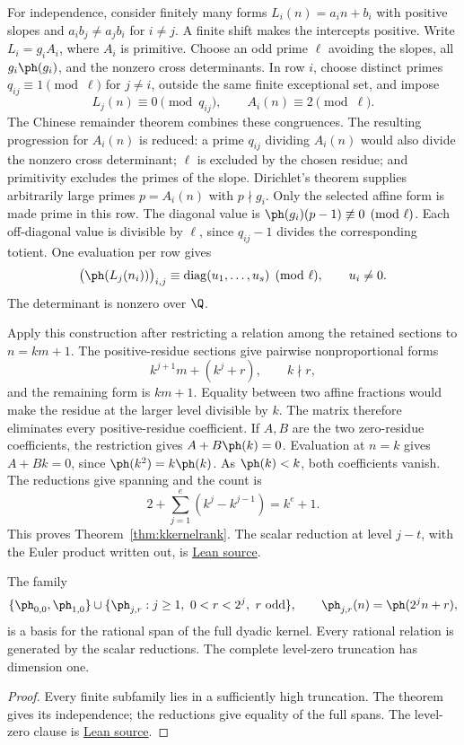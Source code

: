 \documentclass[11pt]{article}
\begin{document}
For independence, consider finitely many forms $L_i(n)=a_in+b_i$ with
positive slopes and $a_ib_j\ne a_jb_i$ for $i\ne j$. A finite shift makes
the intercepts positive. Write $L_i=g_iA_i$, where $A_i$ is primitive.
Choose an odd prime $\ell$ avoiding the slopes, all $g_i\ph(g_i)$, and the
nonzero cross determinants. In row $i$, choose distinct primes
$q_{ij}\equiv1\pmod\ell$ for $j\ne i$, outside the same finite exceptional
set, and impose
\[
 L_j(n)\equiv0\pmod{q_{ij}},\qquad A_i(n)\equiv2\pmod\ell.
\]
The Chinese remainder theorem combines these congruences. The resulting
progression for $A_i(n)$ is reduced: a prime $q_{ij}$ dividing $A_i(n)$
would also divide the nonzero cross determinant; $\ell$ is excluded by the
chosen residue; and primitivity excludes the primes of the slope.
Dirichlet's theorem supplies arbitrarily large primes $p=A_i(n)$ with
$p\nmid g_i$. Only the selected affine form is made prime in this row.
The diagonal value is
$\ph(g_i)(p-1)\not\equiv0\pmod\ell$. Each off-diagonal value is divisible
by $\ell$, since $q_{ij}-1$ divides the corresponding totient.
One evaluation per row gives
\[
 \bigl(\ph(L_j(n_i))\bigr)_{i,j}
 \equiv\operatorname{diag}(u_1,\ldots,u_s)\pmod\ell,
 \qquad u_i\ne0.
\]
The determinant is nonzero over $\Q$.

Apply this construction after restricting a relation among the retained
sections to $n=km+1$. The positive-residue sections give pairwise
nonproportional forms
\[
 k^{j+1}m+(k^j+r),\qquad k\nmid r,
\]
and the remaining form is $km+1$. Equality between two affine fractions
would make the residue at the larger level divisible by $k$. The matrix
therefore eliminates every positive-residue coefficient. If $A,B$ are the
two zero-residue coefficients, the restriction gives
$A+B\ph(k)=0$. Evaluation at $n=k$ gives $A+Bk=0$, since
$\ph(k^2)=k\ph(k)$. As $\ph(k)<k$, both coefficients vanish.
The reductions give spanning and the count is
\[
 2+\sum_{j=1}^e(k^j-k^{j-1})=k^e+1.
\]
This proves Theorem~\ref{thm:kkernelrank}. The scalar reduction at level
$j-t$, with the Euler product written out, is
\href{https://github.com/wcook04/plectis-erdos/blob/f36a98bf3d3e6f65f1074e3b800e3293d5b8a51a/ErdosProblems/Erdos249/PaperCompleteR7/KernelIntegral.lean#L226}{Lean source}.

\begin{corollary}\label{res:basis}
The family
\[
 \{\ph_{0,0},\ph_{1,0}\}
 \cup\{\ph_{j,r}:j\ge1,\ 0<r<2^j,\ r\text{ odd}\},
 \qquad \ph_{j,r}(n)=\ph(2^jn+r),
\]
is a basis for the rational span of the full dyadic kernel. Every rational
relation is generated by the scalar reductions. The complete level-zero
truncation has dimension one.
\end{corollary}
\begin{proof}
Every finite subfamily lies in a sufficiently high truncation. The theorem
gives its independence; the reductions give equality of the full spans.
The level-zero clause is
\href{https://github.com/wcook04/plectis-erdos/blob/f36a98bf3d3e6f65f1074e3b800e3293d5b8a51a/ErdosProblems/Erdos249/PaperCompleteR7/ArithmeticAssemblies.lean#L112}{Lean source}.
\end{proof}
\end{document}
